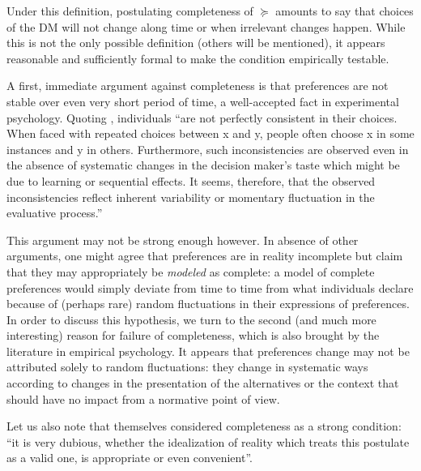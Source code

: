 \documentclass[french, english]{llncs}
\begin{document}
Under this definition, postulating completeness of $\succeq$ amounts to say that choices of the \ac{DM} will not change along time or when irrelevant changes happen. While this is not the only possible definition (others will be mentioned), it appears reasonable and sufficiently formal to make the condition empirically testable.
	
A first, immediate argument against completeness is that preferences are not stable over even very short period of time, a well-accepted fact in experimental psychology. Quoting \citet{tversky_intransitivity_1969}, individuals “are not perfectly consistent in their choices. When faced with repeated choices between x and y, 
people often choose x in some instances and y in others. Furthermore, such inconsistencies are observed even in the absence of systematic changes in the decision maker’s taste which might be due to learning or sequential effects. It seems, therefore, that the observed 
inconsistencies reflect inherent variability 
or momentary fluctuation 
in the evaluative process.” 
	
This argument may not be strong enough however. In absence of other arguments, one might agree that preferences are in reality incomplete but claim that they may appropriately be \emph{modeled} as complete: a model of complete preferences would simply deviate from time to time from what individuals declare because of (perhaps rare) random fluctuations in their expressions of preferences. 
In order to discuss this hypothesis, we turn to the second (and much more interesting) reason for failure of completeness, which is also brought by the literature in empirical psychology. It appears that preferences change may not be attributed solely to random fluctuations: they change in systematic ways according to changes in the presentation of the alternatives or the context that should have no impact from a normative point of view.
	
Let us also note that \citet[p. 630]{von_neumann_theory_2004} themselves considered completeness as a strong condition: “it is very dubious, whether the idealization of reality which treats this postulate as a valid one, is appropriate or even convenient”.
\end{document}
